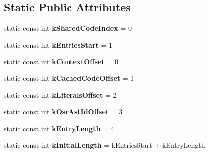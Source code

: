 \subsection*{Static Public Attributes}
\begin{DoxyCompactItemize}
\item 
static const int {\bfseries k\+Shared\+Code\+Index} = 0\hypertarget{classv8_1_1internal_1_1_shared_function_info_af5f1c9b8d8c24f2faed8673b38b0dc9d}{}\label{classv8_1_1internal_1_1_shared_function_info_af5f1c9b8d8c24f2faed8673b38b0dc9d}

\item 
static const int {\bfseries k\+Entries\+Start} = 1\hypertarget{classv8_1_1internal_1_1_shared_function_info_a729064902568c99387215e69f5dcbfc3}{}\label{classv8_1_1internal_1_1_shared_function_info_a729064902568c99387215e69f5dcbfc3}

\item 
static const int {\bfseries k\+Context\+Offset} = 0\hypertarget{classv8_1_1internal_1_1_shared_function_info_ae457da58033018f41b8300f61a4961d7}{}\label{classv8_1_1internal_1_1_shared_function_info_ae457da58033018f41b8300f61a4961d7}

\item 
static const int {\bfseries k\+Cached\+Code\+Offset} = 1\hypertarget{classv8_1_1internal_1_1_shared_function_info_a0d13a7375ce7bdd5590a7ace53e7515d}{}\label{classv8_1_1internal_1_1_shared_function_info_a0d13a7375ce7bdd5590a7ace53e7515d}

\item 
static const int {\bfseries k\+Literals\+Offset} = 2\hypertarget{classv8_1_1internal_1_1_shared_function_info_a934cd80fb656740d9f0c0659c22cb871}{}\label{classv8_1_1internal_1_1_shared_function_info_a934cd80fb656740d9f0c0659c22cb871}

\item 
static const int {\bfseries k\+Osr\+Ast\+Id\+Offset} = 3\hypertarget{classv8_1_1internal_1_1_shared_function_info_a74bdd08a7609ba70b459aa7fd09cd30e}{}\label{classv8_1_1internal_1_1_shared_function_info_a74bdd08a7609ba70b459aa7fd09cd30e}

\item 
static const int {\bfseries k\+Entry\+Length} = 4\hypertarget{classv8_1_1internal_1_1_shared_function_info_ae6a1d8883ff11916d52d1b13b0c6a41d}{}\label{classv8_1_1internal_1_1_shared_function_info_ae6a1d8883ff11916d52d1b13b0c6a41d}

\item 
static const int {\bfseries k\+Initial\+Length} = k\+Entries\+Start + k\+Entry\+Length\hypertarget{classv8_1_1internal_1_1_shared_function_info_aaf4511ccafdd97f715e55e7e8cf8a967}{}\label{classv8_1_1internal_1_1_shared_function_info_aaf4511ccafdd97f715e55e7e8cf8a967}


\end{DoxyCompactItemize}
